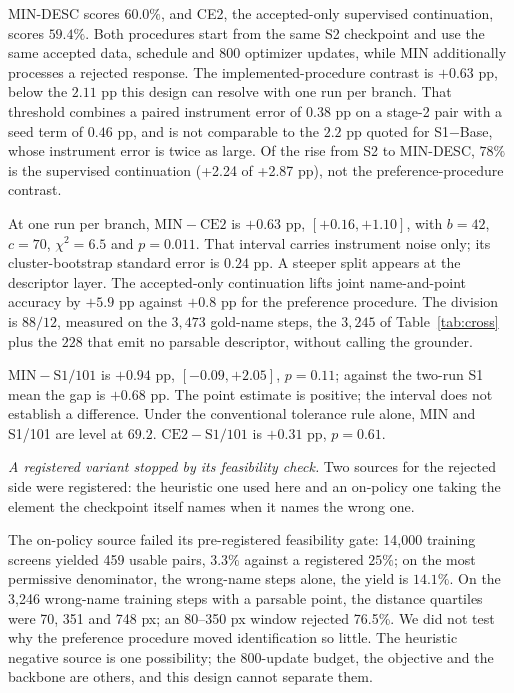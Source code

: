 \documentclass[conference]{IEEEtran}
\begin{document}
MIN-DESC scores $60.0\%$, and CE2, the accepted-only supervised continuation, scores
$59.4\%$. Both procedures start from the same S2 checkpoint and use the same accepted data,
schedule and 800 optimizer updates, while MIN additionally processes a rejected response. The
implemented-procedure contrast is $+0.63$ pp, below the $2.11$ pp this design can resolve
with one run per branch. That threshold combines a paired instrument error of $0.38$ pp on a
stage-2 pair with a seed term of $0.46$ pp, and is not comparable to the $2.2$ pp quoted for
S1$-$Base, whose instrument error is twice as large. Of the rise from S2 to MIN-DESC, $78\%$ is the supervised
continuation (+2.24 of +2.87 pp), not the preference-procedure contrast.

At one run per branch, $\mathrm{MIN}-\mathrm{CE2}$ is $+0.63$ pp, $[+0.16, +1.10]$, with
$b = 42$, $c = 70$, $\chi^2 = 6.5$ and $p = 0.011$. That interval carries instrument noise
only; its cluster-bootstrap standard error is $0.24$ pp. A steeper split appears at the
descriptor layer. The accepted-only continuation lifts joint name-and-point accuracy by $+5.9$ pp against
$+0.8$ pp for the preference procedure. The division is $88/12$, measured on the $3{,}473$
gold-name steps, the $3{,}245$ of Table~\ref{tab:cross} plus the $228$ that emit no parsable
descriptor, without calling the grounder.

$\mathrm{MIN}-\mathrm{S1/101}$ is $+0.94$ pp, $[-0.09, +2.05]$, $p = 0.11$; against the
two-run S1 mean the gap is $+0.68$ pp. The point estimate
is positive; the interval does not establish a difference.
Under the conventional tolerance rule alone, MIN and S1/101 are level at $69.2$.
$\mathrm{CE2}-\mathrm{S1/101}$ is $+0.31$ pp, $p = 0.61$.

\emph{A registered variant stopped by its feasibility check.} Two sources for the rejected
side were registered: the heuristic one used here and an on-policy one taking the element
the checkpoint itself names when it names the wrong one.

The on-policy source failed its pre-registered feasibility gate: 14,000 training screens
yielded 459 usable pairs, $3.3\%$ against a registered $25\%$; on the most permissive
denominator, the wrong-name steps alone, the yield is $14.1\%$. On the 3,246 wrong-name training steps with a parsable point, the
distance quartiles were 70, 351 and 748 px; an 80--350 px window rejected 76.5\%. We did not
test why the preference procedure moved identification so little. The heuristic negative
source is one possibility; the 800-update budget, the objective and the backbone are others,
and this design cannot separate them.
\end{document}

